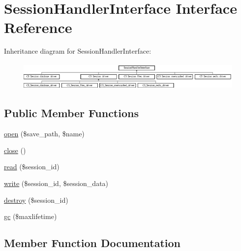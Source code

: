 \hypertarget{interface_session_handler_interface}{}\section{Session\+Handler\+Interface Interface Reference}
\label{interface_session_handler_interface}
Inheritance diagram for Session\+Handler\+Interface\+:\begin{figure}[H]
\begin{center}
\leavevmode
\includegraphics[height=1.414141cm]{interface_session_handler_interface}
\end{center}
\end{figure}
\subsection*{Public Member Functions}
\begin{DoxyCompactItemize}
\item 
\mbox{\hyperlink{interface_session_handler_interface_a614b5cf3840833913c7a73260ed28e02}{open}} (\$save\+\_\+path, \$name)
\item 
\mbox{\hyperlink{interface_session_handler_interface_aa69c8bf1f1dcf4e72552efff1fe3e87e}{close}} ()
\item 
\mbox{\hyperlink{interface_session_handler_interface_a5bbf84ebf657be4eaccc0582377c76bf}{read}} (\$session\+\_\+id)
\item 
\mbox{\hyperlink{interface_session_handler_interface_ad9d124885be93668f1dbf6aace5964f5}{write}} (\$session\+\_\+id, \$session\+\_\+data)
\item 
\mbox{\hyperlink{interface_session_handler_interface_aaec5812f6b4eb6835f88d3baa06a002a}{destroy}} (\$session\+\_\+id)
\item 
\mbox{\hyperlink{interface_session_handler_interface_a57aff7ee0656d8aa75d545fb8b3ae35d}{gc}} (\$maxlifetime)
\end{DoxyCompactItemize}


\subsection{Member Function Documentation}
\mbox{\label{interface_session_handler_interface_aa69c8bf1f1dcf4e72552efff1fe3e87e}} 

